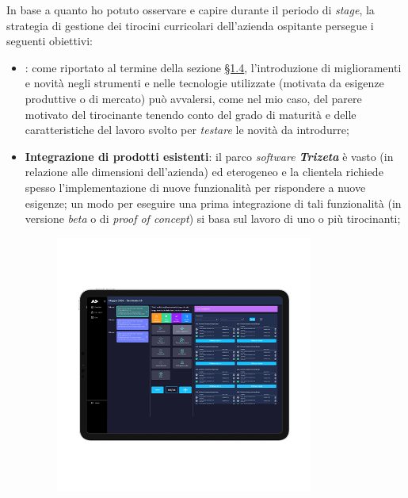 In base a quanto ho potuto osservare e capire durante il periodo di \textit{stage}, la strategia di gestione dei tirocini curricolari dell'azienda ospitante persegue i seguenti obiettivi:
\begin{itemize}
    \item {}: come riportato al termine della sezione \hyperref[sec:innovazione]{§1.4}, l'introduzione di miglioramenti e novità negli strumenti e nelle tecnologie utilizzate (motivata da esigenze produttive o di mercato)
    può avvalersi, come nel mio caso, del parere motivato del tirocinante tenendo conto del grado di maturità e delle caratteristiche del lavoro svolto per \textit{testare} le novità da introdurre;
    \item \textbf{Integrazione di prodotti esistenti}: il parco \textit{software \textbf{Trizeta}} è vasto (in relazione alle dimensioni dell'azienda) ed eterogeneo e la clientela richiede spesso l'implementazione di nuove funzionalità per rispondere a nuove esigenze; un modo per eseguire
        una prima integrazione di tali funzionalità (in versione \textit{beta} o di \textit{proof of concept}) si basa sul lavoro di uno o più tirocinanti;
        \vspace{-20mm}
        \begin{figure}[H]
            \centering
            \includegraphics[width=0.8\textwidth]{images/ademes.png}

\end{figure}
\end{itemize}
